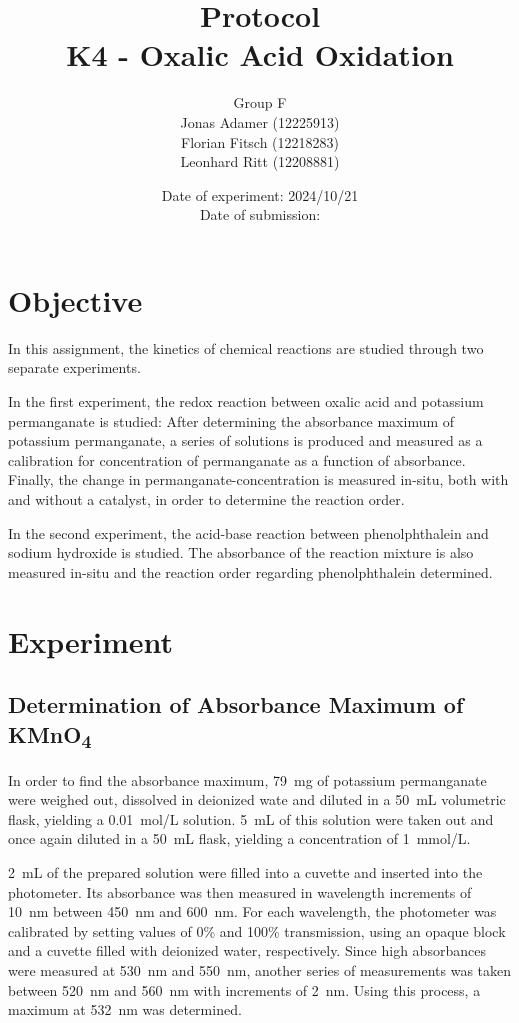 \documentclass[titlepage]{article}
\title{Protocol \\ K4 - Oxalic Acid Oxidation}
\author{Group F\\Jonas Adamer (12225913)\\Florian Fitsch (12218283)\\Leonhard Ritt (12208881)}
\date{Date of experiment: 2024/10/21\\Date of submission:}
\begin{document}
\maketitle
\thispagestyle{empty}

\newpage
\tableofcontents
\thispagestyle{fancy}


\newpage
\section{Objective}
In this assignment, the kinetics of chemical reactions are studied through two separate experiments.

In the first experiment, the redox reaction between oxalic acid and potassium permanganate is studied: After determining the absorbance maximum of potassium permanganate, a series of solutions is produced and measured as a calibration for concentration of permanganate as a function of absorbance. Finally, the change in permanganate-concentration is measured in-situ, both with and without a catalyst, in order to determine the reaction order.

In the second experiment, the acid-base reaction between phenolphthalein and sodium hydroxide is studied. The absorbance of the reaction mixture is also measured in-situ and the reaction order regarding phenolphthalein determined.

\section{Experiment}
\subsection{Determination of Absorbance Maximum of KMnO\texorpdfstring{\textsubscript{4}}{4}} \label{ssec_experiment_abs_maximum}
In order to find the absorbance maximum, 79~mg of potassium permanganate were weighed out, dissolved in deionized wate and diluted in a 50~mL volumetric flask, yielding a 0.01~mol/L solution. 5~mL of this solution were taken out and once again diluted in a 50~mL flask, yielding a concentration of 1~mmol/L.

2~mL of the prepared solution were filled into a cuvette and inserted into the photometer. Its absorbance was then measured in wavelength increments of 10~nm between 450~nm and 600~nm. For each wavelength, the photometer was calibrated by setting values of 0\% and 100\% transmission, using an opaque block and a cuvette filled with deionized water, respectively. Since high absorbances were measured at 530~nm and 550~nm, another series of measurements was taken between 520~nm and 560~nm with increments of 2~nm. Using this process, a maximum at 532~nm was determined.
\end{document}
